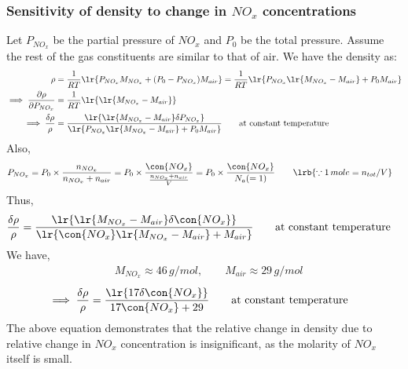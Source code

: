 \subsubsection{Sensitivity of density to change in $NO_x$ concentrations}
Let $P_{NO_x}$ be the partial pressure of $NO_x$ and $P_0$ be the total pressure. Assume the rest of the gas constituents are similar to that of air. We have the density as:
\begin{align*}
    \rho &= \frac{1}{RT} \lr{ P_{NO_x} M_{NO_x} + (P_0 - P_{NO_x}) M_{air}} = \frac{1}{RT} \lr{ P_{NO_x} \lr{M_{NO_x} - M_{air}} + P_0 M_{air}}\\
    \implies \frac{\partial \rho}{\partial P_{NO_x}} &= \frac{1}{RT} \lr{\lr{M_{NO_x} - M_{air}}}\\
    \implies \frac{\delta \rho}{\rho} &= \frac{\lr{\lr{M_{NO_x} - M_{air}} \delta P_{NO_x}}}{\lr{ P_{NO_x} \lr{M_{NO_x} - M_{air}} + P_0 M_{air}}} \qquad \text{at constant temperature}
\end{align*}
Also,
\begin{align*}
    P_{NO_x} &= P_0 \times \frac{n_{NO_x}}{n_{NO_x} + n_{air}} = P_0 \times \frac{\con{NO_x}}{\frac{n_{NO_x} + n_{air}}{V}} = P_0 \times \frac{\con{NO_x}}{N_a (=1)} \qquad \lrb{\because 1 \, mole = n_{tot}/V}
\end{align*}
Thus,
\begin{align*}
    \frac{\delta \rho}{\rho} &= \frac{\lr{\lr{M_{NO_x} - M_{air}} \delta \con{NO_x}}}{\lr{ \con{NO_x}
 \lr{M_{NO_x} - M_{air}} + M_{air}}}
    \qquad \text{at constant temperature}
\end{align*}
We have,
\begin{align*}
    &M_{NO_x} \approx 46 \, g/mol, \qquad M_{air} \approx 29 \, g/mol
\end{align*}
\begin{align*}
    \implies \frac{\delta \rho}{\rho} &= \frac{\lr{ 17 \delta \con{NO_x}}}{17 \con{NO_x} + 29}
    \qquad \text{at constant temperature}
\end{align*}
The above equation demonstrates that the relative change in density due to relative change in $NO_x$ concentration is insignificant, as the molarity of $NO_x$ itself is small.


